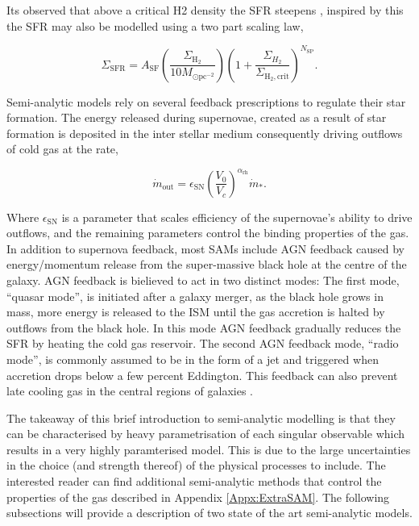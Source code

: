 Its observed that above a critical H2 density the SFR steepens \citep{Narayanan2012ALaw}, inspired by this the SFR may also be modelled using a two part scaling law, 

\begin{equation}
    \Sigma_{\mathrm{SFR}}=A_{\mathrm{SF}}\left(\frac{\Sigma_{\mathrm{H}_{2}}}{10 M_{\odot \mathrm{pc}^{-2}}}\right)\left(1+\frac{\Sigma_{H_{2}}}{\Sigma_{\mathrm{H}_{2}, \mathrm{crit}}}\right)^{N_{\mathrm{SP}}}.
\end{equation}

Semi-analytic models rely on several feedback prescriptions to regulate their star formation. The energy released during supernovae, created as a result of star formation is deposited in the inter stellar medium consequently driving outflows of cold gas at the rate,

\begin{equation}
    \dot{m}_{\mathrm{out}}=\epsilon_{\mathrm{SN}}\left(\frac{V_{0}}{V_{c}}\right)^{\alpha_{\mathrm{rh}}} \dot{m}_{*}.
\end{equation}

Where $\epsilon_{\mathrm{SN}}$ is a parameter that scales efficiency of the supernovae's ability to drive outflows, and the remaining parameters control the  binding properties of the gas. In addition to supernova feedback, most SAMs include AGN feedback caused by energy/momentum release from the super-massive black hole at the centre of the galaxy. AGN feedback is bielieved to act in two distinct modes: The first mode, ``quasar mode'', is initiated after a galaxy merger, as the black hole grows in mass, more energy is released to the ISM until the gas accretion is halted by outflows from the black hole. In this mode AGN feedback gradually reduces the SFR by heating the cold gas reservoir. The second AGN feedback mode, ``radio mode'', is commonly assumed to be in the form of a jet and triggered when accretion drops below a few percent Eddington. This feedback can also prevent late cooling gas in the central regions of galaxies \cite{Croton2007Thequenching}.

The takeaway of this brief introduction to semi-analytic modelling is that they can be characterised by heavy parametrisation of each singular observable which results in a very highly paramterised model. This is due to the large uncertainties in the choice (and strength thereof) of the physical processes to include. The interested reader can find additional semi-analytic methods that control the properties of the gas described in Appendix \ref{Appx:ExtraSAM}. The following subsections will provide a description of two state of the art semi-analytic models.

